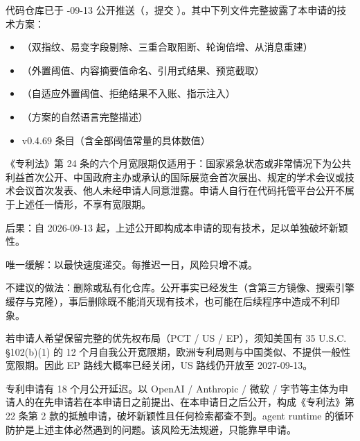 \documentclass[11pt,UTF8]{ctexart}
\begin{document}


代码仓库已于 {-09-13} 公开推送（，提交 ）。其中下列文件完整披露了本申请的技术方案：

\begin{itemize}
  \item {}（双指纹、易变字段剔除、三重合取阻断、轮询倍增、从消息重建）
  \item {}（外置阈值、内容摘要值命名、引用式结果、预览截取）
  \item {}（自适应外置阈值、拒绝结果不入账、指示注入）
  \item {}（方案的自然语言完整描述）
  \item {} v0.4.69 条目（含全部阈值常量的具体数值）
\end{itemize}

《专利法》第 24 条的六个月宽限期仅适用于：国家紧急状态或非常情况下为公共利益首次公开、中国政府主办或承认的国际展览会首次展出、规定的学术会议或技术会议首次发表、他人未经申请人同意泄露。{\ntbf 申请人自行在代码托管平台公开不属于上述任一情形，不享有宽限期。}

{\ntbf 后果}：自 2026-09-13 起，上述公开即构成本申请的现有技术，足以单独破坏新颖性。

{\ntbf 唯一缓解}：以最快速度递交。每推迟一日，风险只增不减。

{\ntbf 不建议}的做法：删除或私有化仓库。公开事实已经发生（含第三方镜像、搜索引擎缓存与克隆），事后删除既不能消灭现有技术，也可能在后续程序中造成不利印象。

\begin{nquote}
若申请人希望保留完整的优先权布局（PCT / US / EP），须知美国有 35 U.S.C. §102(b)(1) 的 12 个月自我公开宽限期，欧洲专利局则与中国类似、{\ntbf 不提供}一般性宽限期。因此 EP 路线大概率已经关闭，US 路线仍开放至 2027-09-13。
\end{nquote}


专利申请有 18 个月公开延迟。以 OpenAI / Anthropic / 微软 / 字节等主体为申请人的在先申请若在本申请日之前提出、在本申请日之后公开，构成《专利法》第 22 条第 2 款的抵触申请，破坏新颖性且任何检索都查不到。agent runtime 的循环防护是上述主体必然遇到的问题。该风险{\ntbf 无法规避，只能靠早申请}。
\end{document}
